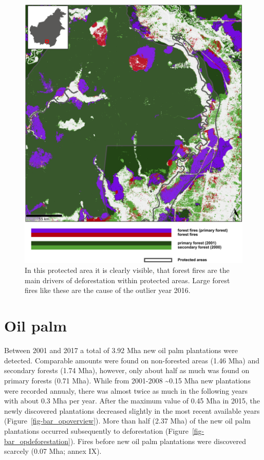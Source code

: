 \documentclass[
  letterpaper,
  DIV=11,
  numbers=noendperiod]{scrreprt}
\begin{document}
\newpage

\begin{figure}[H]

{\centering \includegraphics{text/../code/results/maps/deforestation_protected_areas_forest_fires.png}

}

\caption{\label{fig-mapforestfires}In this protected area it is clearly
visible, that forest fires are the main drivers of deforestation within
protected areas. Large forest fires like these are the cause of the
outlier year 2016.}

\end{figure}

\hypertarget{oil-palm-1}{%
\section{Oil palm}\label{oil-palm-1}}

Between 2001 and 2017 a total of 3.92 Mha new oil palm plantations were
detected. Comparable amounts were found on non-forested areas (1.46 Mha)
and secondary forests (1.74 Mha), however, only about half as much was
found on primary forests (0.71 Mha). While from 2001-2008
\textasciitilde0.15 Mha new plantations were recorded annualy, there was
almost twice as much in the following years with about 0.3 Mha per year.
After the maximum value of 0.45 Mha in 2015, the newly discovered
plantations decreased slightly in the most recent available years
(Figure~\ref{fig-bar_opoverview}). More than half (2.37 Mha) of the new
oil palm plantations occurred subsequently to deforestation
(Figure~\ref{fig-bar_opdeforestation}). Fires before new oil palm
plantations were discovered scarcely (0.07 Mha; annex IX).
\end{document}
